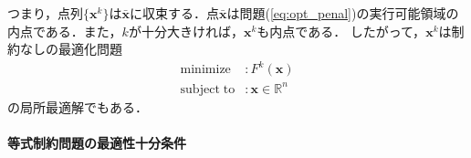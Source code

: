 \documentclass{jsreport}
\begin{document}
つまり，点列$\{\bm{x}^k\}$は$\bar{\bm{x}}$に収束する．点$\bar{\bm{x}}$は問題(\ref{eq:opt_penal})の実行可能領域の内点である．また，$k$が十分大きければ，$\bm{x}^k$も内点である．
したがって，$\bm{x}^k$は制約なしの最適化問題
\begin{align}\label{eq:opt_penal_non}
  \mathrm{minimize} &: F^k(\bm{x}) \nonumber\\
  \mathrm{subject \; to} &: \bm{x} \in \mathbb{R}^n
\end{align}
の局所最適解でもある．



\paragraph{等式制約問題の最適性十分条件}
\end{document}
